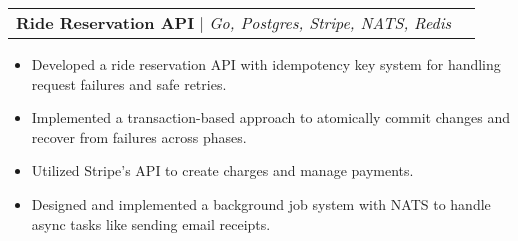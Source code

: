 \documentclass[letterpaper,11pt]{article}
\makeatletter
\newcommand{\resumeItem}[1]{
  \item\small{
    {#1 \vspace{-2pt}}
  }
}
\newcommand{\resumeProjectHeading}[2]{
    \item
    \begin{tabular*}{0.97\textwidth}{l@{\extracolsep{\fill}}r}
      \small#1 & #2 \\
    \end{tabular*}\vspace{-7pt}
}
\newcommand{\resumeItemListStart}{\begin{itemize}}
\newcommand{\resumeItemListEnd}{\end{itemize}\vspace{-5pt}}
\makeatother
\begin{document}
        

            


        \resumeProjectHeading
        {\textbf{Ride Reservation API} $|$ \emph{Go, Postgres, Stripe, NATS, Redis}}{}
        \resumeItemListStart
            \resumeItem{Developed a ride reservation API with idempotency key system for handling request failures and safe retries.}
            \resumeItem{Implemented a transaction-based approach to atomically commit changes and recover from failures across phases.}
            \resumeItem{Utilized Stripe's API to create charges and manage payments.}
            \resumeItem{Designed and implemented a background job system with NATS to handle async tasks like sending email receipts.}
        \resumeItemListEnd
\end{document}
